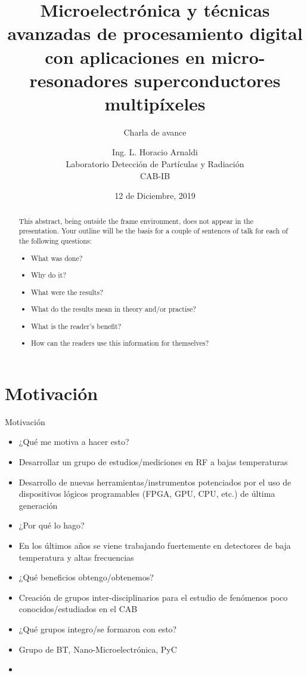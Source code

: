 \documentclass[ignorenonframetext,12pt]{beamer}
\title{Microelectrónica y técnicas avanzadas de procesamiento digital con
aplicaciones en micro-resonadores superconductores multipíxeles}
\subtitle{\alert{Charla de avance}}
\author{Ing. L. Horacio Arnaldi\\
Laboratorio Detecci\'on de Part\'iculas y Radiaci\'on\\
CAB-IB}
\date{12 de Diciembre, 2019}
\begin{document}
\begin{frame}
				\maketitle
\end{frame}

\begin{abstract}
				This abstract, being outside the frame environment, does not appear in
				the presentation.  Your outline will be the basis for a couple of
				sentences of talk for each of the following questions:
				\begin{itemize}
								\item What was done?
								\item Why do it?
								\item What were the results?
								\item What do the results mean in theory and/or practise?
								\item What is the reader's benefit?
								\item How can the readers use this information for themselves? 
				\end{itemize}
\end{abstract}


\section{Motivación}
\begin{frame}{Motivación}
				\begin{itemize}
								\item ¿Qué me motiva a hacer esto?
								\item Desarrollar un grupo de estudios/mediciones en RF a bajas
												temperaturas
								\item Desarrollo de nuevas herramientas/instrumentos potenciados
												por el uso de dispositivos lógicos programables (FPGA,
												GPU, CPU, etc.) de última generación
								\item ¿Por qué lo hago?
								\item En los últimos años se viene trabajando fuertemente en
												detectores de baja temperatura y altas frecuencias
								\item ¿Qué beneficios obtengo/obtenemos?
								\item Creación de grupos inter-disciplinarios para el estudio de
												fenómenos poco conocidos/estudiados en el CAB
								\item ¿Qué grupos integro/se formaron con esto?
								\item Grupo de BT, Nano-Microelectrónica, PyC
								\item 
				\end{itemize}

\end{frame}
\end{document}
